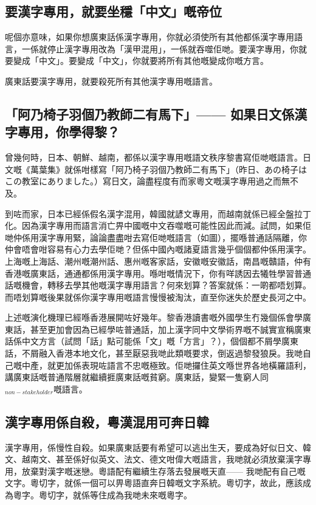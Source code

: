 \documentclass[a5paper, 12pt, openany]{book} %
\begin{document}
\subsection*{要漢字專用，就要坐穩「中文」嘅帝位}
呢個亦意味，如果你想廣東話係漢字專用，你就必須使所有其他都係漢字專用語言，一係就停止漢字專用改為「漢甲混用」，一係就吞噬佢哋。要漢字專用，你就要變成「中文」。要變成「中文」，你就要將所有其他嘅變成你嘅方言。

廣東話要漢字專用，就要殺死所有其他漢字專用嘅語言。

\subsection*{「阿乃椅子羽個乃教師二有馬下」—— 如果日文係漢字專用，你學得黎？}
曾幾何時，日本、朝鮮、越南，都係以漢字專用嘅語文秩序黎書寫佢哋嘅語言。日文嘅《萬葉集》就係咁樣寫「阿乃椅子羽個乃教師二有馬下」（昨日、あの椅子はこの教室にありました。）寫日文，論盡程度有而家粵文嘅漢字專用過之而無不及。

到咗而家，日本已經係假名漢字混用，韓國就諺文專用，而越南就係已經全盤拉丁化。因為漢字專用而語言消亡畀中國嘅中文吞噬嘅可能性因此而減。試問，如果佢哋仲係用漢字專用緊，論論盡盡咁去寫佢哋嘅語言（如圖），擺喺普通話隔離，你仲會唔會咁容易有心力去學佢哋？但係中國內嘅諸夏語言幾乎個個都仲係用漢字。上海嘅上海話、潮州嘅潮州話、惠州嘅客家話，安徽嘅安徽話，南昌嘅贛語，仲有香港嘅廣東話，通通都係用漢字專用。喺咁嘅情況下，你有咩誘因去犧牲學習普通話嘅機會，轉移去學其他嘅漢字專用語言？何來划算？答案就係：一啲都唔划算。而唔划算嘅後果就係你漢字專用嘅語言慢慢被淘汰，直至你迷失於歷史長河之中。

上述嘅演化機理已經喺香港展開咗好幾年。黎香港讀書嘅外國學生冇幾個係會學廣東話，甚至更加會因為已經學咗普通話，加上漢字同中文學術界嘅不誠實宣稱廣東話係中文方言（試問「話」點可能係「文」嘅「方言」？），個個都不屑學廣東話，不屑融入香港本地文化，甚至厭惡我哋此類嘅要求，倒返過黎發狼戾。我哋自己嘅中產，就更加係表現咗語言不忠嘅極致。佢哋攞住英文喺世界各地橫羅語利，講廣東話嘅普通階層就繼續捱廣東話嘅貧窮。廣東話，變緊一隻窮人同$_{non-stakeholder}$嘅語言。

\subsection*{漢字專用係自殺，粵漢混用可奔日韓}
漢字專用，係慢性自殺。如果廣東話要有希望可以逃出生天，要成為好似日文、韓文、越南文、甚至係好似英文、法文、德文咁偉大嘅語言，我哋就必須放棄漢字專用，放棄對漢字嘅迷戀。粵語配有繼續生存落去發展嘅天直—— 我哋配有自己嘅文字。粵切字，就係一個可以畀粵語直奔日韓嘅文字系統。粵切字，故此，應該成為粵字。粵切字，就係等住成為我哋未來嘅粵字。
\end{document}
